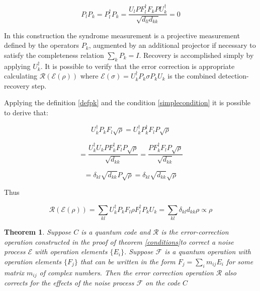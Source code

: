 \documentclass{article}
\newtheorem{theorem}{Theorem}
\begin{document}
\begin{equation}
	P_l P_k = P_l^\dagger P_k = \dfrac{U_l P F_l^\dagger F_k P U_k^\dagger}{\sqrt{d_{ll}d_{kk}}} = 0
\end{equation}

In this construction the syndrome measurement is a projective measurement defined by
the operators $P_k$, augmented by an additional projector if necessary to satisfy
the completeness relation $\sum_k P_k = I$.
Recovery is accomplished simply by applying $U_k^\dagger$.
It is possible to verify that the error correction is appropriate calculating
$ \mathcal{R}(\mathcal{E}(\rho)) $ where $\mathcal{E}(\sigma) = U_k^\dagger P_k \sigma P_k U_k$
is the combined detection-recovery step.

Applying the definition \ref{defpk} and the condition \ref{simplecondition}
it is possible to derive that:

\begin{equation}
	U_k^\dagger P_k F_l \sqrt{\rho} = U_k^\dagger P_k^\dagger F_l P \sqrt{\rho}
\end{equation}

\begin{equation}
	=	\dfrac{U_k^\dagger U_k P F_k^\dagger F_l P \sqrt{\rho}}{\sqrt{d_{kk}}} = \dfrac{P F_k^\dagger F_l P \sqrt{\rho}}{\sqrt{d_{kk}}}
\end{equation}

\begin{equation}
	= \delta_{kl} \sqrt{d_{kk}} P \sqrt{\rho} = \delta_{kl} \sqrt{d_{kk}} \sqrt{\rho}
\end{equation}

Thus

\begin{equation}
	\mathcal{R}(\mathcal{E}(\rho)) = \sum_{kl} U_k^\dagger P_k F_l \rho F_l^\dagger P_k U_k = \sum_{kl} \delta_{kl} d_{kk} \rho \propto \rho
\end{equation}






\begin{theorem}
	Suppose $C$ is a quantum code and $\mathcal{R}$ is the error-correction operation
	constructed in the proof of theorem \ref{conditions}to correct a
	noise process $\mathcal{E}$ with operation elements $\{E_i\}$.
	Suppose $\mathcal{F}$ is a quantum operation with operation elements $\{F_j\}$
	that can be written in the form $F_j = \sum_i m_{ij} E_i$ for some matrix $m_{ij}$
	of complex numbers.
	Then the error correction operation $\mathcal{R}$ also corrects for the effects
	of the noise process $\mathcal{F}$ on the code $C$
\end{theorem}
\end{document}
